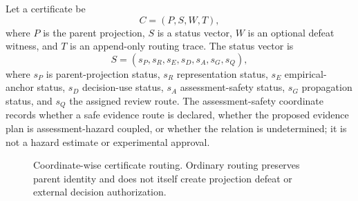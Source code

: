 \documentclass[11pt]{article}
\begin{document}
Let a certificate be
\begin{equation}
C=(P,S,W,T),
\label{eq:certificate}
\end{equation}
where $P$ is the parent projection, $S$ is a status vector, $W$ is an optional defeat witness, and $T$ is an append-only routing trace. The status vector is
\begin{equation}
S=(s_P,s_R,s_E,s_D,s_A,s_G,s_Q),
\label{eq:status-vector}
\end{equation}
where $s_P$ is parent-projection status, $s_R$ representation status, $s_E$ empirical-anchor status, $s_D$ decision-use status, $s_A$ assessment-safety status, $s_G$ propagation status, and $s_Q$ the assigned review route. The  assessment-safety coordinate records whether a safe evidence route is declared, whether the proposed evidence plan is assessment-hazard coupled, or whether the relation is undetermined; it is not a hazard estimate or experimental approval.

\begin{figure}[htbp]
\centering
{}
\caption{Coordinate-wise certificate routing. Ordinary routing preserves parent identity and does not itself create projection defeat or external decision authorization.}
\label{fig:certificate-routing}
\end{figure}
\end{document}
